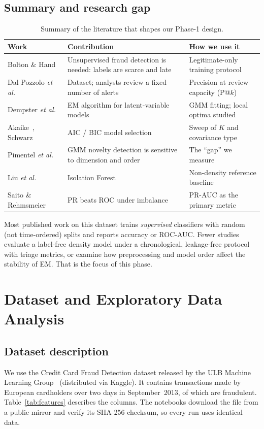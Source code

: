 \documentclass[12pt]{article}
\begin{document}
\subsection{Summary and research gap}
\begin{table}[H]
\centering\small
\caption{Summary of the literature that shapes our Phase-1 design.}
\label{tab:lit}
\begin{tabularx}{\linewidth}{@{}l X X@{}}
\toprule
\textbf{Work} & \textbf{Contribution} & \textbf{How we use it}\\
\midrule
Bolton \& Hand~\cite{bolton2002} & Unsupervised fraud detection is needed: labels are scarce and late & Legitimate-only training protocol\\
Dal Pozzolo \emph{et al.}~\cite{dalpozzolo2015,dalpozzolo2018} & Dataset; analysts review a fixed number of alerts & Precision at review capacity (P@$k$)\\
Dempster \emph{et al.}~\cite{dempster1977} & EM algorithm for latent-variable models & GMM fitting; local optima studied\\
Akaike~\cite{akaike1974}, Schwarz~\cite{schwarz1978} & AIC / BIC model selection & Sweep of $K$ and covariance type\\
Pimentel \emph{et al.}~\cite{pimentel2014} & GMM novelty detection is sensitive to dimension and order & The ``gap'' we measure\\
Liu \emph{et al.}~\cite{liu2008} & Isolation Forest & Non-density reference baseline\\
Saito \& Rehmsmeier~\cite{saito2015} & PR beats ROC under imbalance & PR-AUC as the primary metric\\
\bottomrule
\end{tabularx}
\end{table}
Most published work on this dataset trains \emph{supervised} classifiers with random (not time-ordered) splits and
reports accuracy or ROC-AUC. Fewer studies evaluate a label-free density model under a chronological, leakage-free
protocol with triage metrics, or examine how preprocessing and model order affect the stability of EM. That is the
focus of this phase.

\section{Dataset and Exploratory Data Analysis}\label{sec:data}

\subsection{Dataset description}
We use the Credit Card Fraud Detection dataset released by the ULB Machine Learning Group~\cite{dalpozzolo2015}
(distributed via Kaggle). It contains \nRowsRaw{} transactions made by European cardholders over two days in
September~2013, of which \nFraudRaw{} are fraudulent. Table~\ref{tab:features} describes the columns. The notebooks
download the file from a public mirror and verify its SHA-256 checksum, so every run uses identical data.
\end{document}
